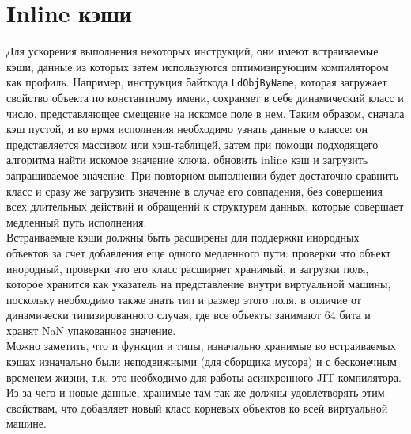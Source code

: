 \documentclass[times,specification,annotation]{itmo-student-thesis}
\begin{document}
\section{Inline кэши}
Для ускорения выполнения некоторых инструкций, они имеют встраиваемые кэши, данные из которых затем используются оптимизирующим компилятором как профиль. Например, инструкция байткода \texttt{LdObjByName}, которая загружает свойство объекта по константному имени, сохраняет в себе динамический класс и число, представляющее смещение на искомое поле в нем. Таким образом, сначала кэш пустой, и во врмя исполнения необходимо узнать данные о классе: он представляется массивом или хэш-таблицей, затем при помощи подходящего алгоритма найти искомое значение ключа, обновить inline кэш и загрузить запрашиваемое значение. При повторном выполнении будет достаточно сравнить класс и сразу же загрузить значение в случае его совпадения, без совершения всех длительных действий и обращений к структурам данных, которые совершает медленный путь исполнения.\\
Встраиваемые кэши должны быть расширены для поддержки инородных объектов за счет добавления еще одного медленного пути: проверки что объект инородный, проверки что его класс расширяет хранимый, и загрузки поля, которое хранится как указатель на представление внутри виртуальной машины, поскольку необходимо также знать тип и размер этого поля, в отличие от динамически типизированного случая, где все объекты занимают 64 бита и хранят NaN упакованное значение.\\
Можно заметить, что и функции и типы, изначально хранимые во встраиваемых кэшах изначально были неподвижными (для сборщика мусора) и с бесконечным временем жизни, т.к. это необходимо для работы асинхронного JIT компилятора. Из-за чего и новые данные, хранимые там так же должны удовлетворять этим свойствам, что добавляет новый класс корневых объектов ко всей виртуальной машине.
\end{document}
